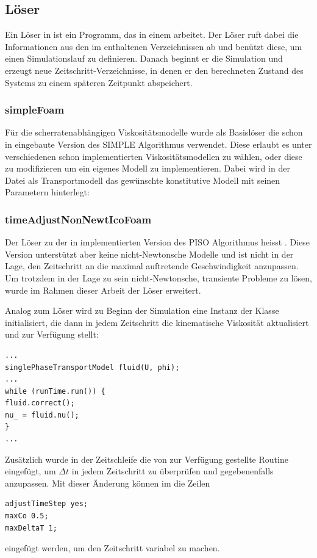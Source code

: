 \subsection{Löser}
Ein Löser in \openfoam{} ist ein \cpp{} Programm, das in einem  arbeitet. Der Löser ruft dabei die Informationen aus den im  enthaltenen Verzeichnissen ab und benützt diese, um einen Simulationslauf zu definieren. Danach beginnt er die Simulation und erzeugt neue Zeitschritt-Verzeichnisse, in denen er den berechneten Zustand des Systems zu einem späteren Zeitpunkt abspeichert.

\subsubsection{simpleFoam}
Für die scherratenabhängigen Viskositätsmodelle wurde als Basislöser die schon in \openfoam{} eingebaute Version  des SIMPLE Algorithmus verwendet.
Diese erlaubt es unter verschiedenen schon implementierten Viskositätsmodellen zu wählen, oder diese zu modifizieren um ein eigenes Modell zu implementieren.
Dabei wird in der Datei  als Transportmodell das ge\-wünsch\-te konstitutive Modell mit seinen Parametern hinterlegt:
%
\subsubsection{timeAdjustNonNewtIcoFoam}
Der Löser zu der in \openfoam{} implementierten Version des PISO Algorithmus heisst .
Diese Version unterstützt aber keine nicht-Newtonsche Modelle und ist nicht in der Lage, den Zeit\-schritt an die maximal auftretende Geschwindigkeit anzupassen.
Um trotzdem in der Lage zu sein nicht-Newtonsche, transiente Probleme zu lösen, wurde im Rahmen dieser Arbeit der Löser  erweitert.

Analog zum Löser  wird zu Beginn der Simulation eine Instanz der Klasse  initialisiert, die dann in jedem Zeitschritt die kinematische Viskosität aktualisiert und zur Verfügung stellt:
%
\newpage
\begin{lstlisting}
...
singlePhaseTransportModel fluid(U, phi);
...
while (runTime.run()) {
fluid.correct();
nu_ = fluid.nu();
}
...
\end{lstlisting}
%
Zusätzlich wurde in der Zeitschleife die von \openfoam{} zur Verfügung gestellte Routine  eingefügt, um $\Delta t$ in jedem Zeitschritt zu überprüfen und gegebenenfalls anzupassen.
Mit dieser Änderung können im  die Zeilen
%
\begin{lstlisting}
adjustTimeStep yes;
maxCo 0.5;
maxDeltaT 1;
\end{lstlisting}
%
eingefügt werden, um den Zeitschritt variabel zu machen.

